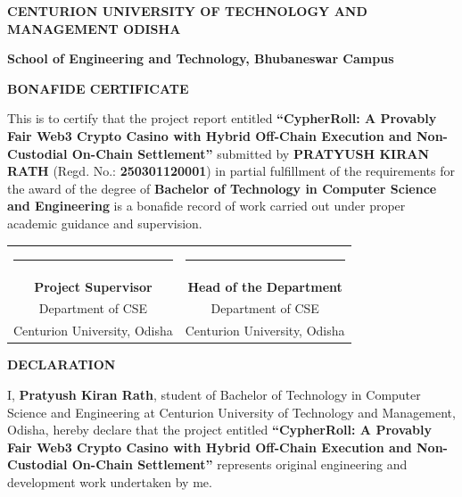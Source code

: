 \newpage
{}
\setcounter{page}{2}
\pagestyle{frontmatterstyle}
\thispagestyle{frontmatterstyle}
\begin{center}
    {\large \textbf{CENTURION UNIVERSITY OF TECHNOLOGY AND MANAGEMENT ODISHA}\par}
    \vspace{0.15cm}
    {\normalsize \textbf{School of Engineering and Technology, Bhubaneswar Campus}\par}
    \vspace{0.8cm}
    {\Large \textbf{BONAFIDE CERTIFICATE}\par}
    \vspace{0.8cm}
\end{center}

This is to certify that the project report entitled \textbf{``CypherRoll: A Provably Fair Web3 Crypto Casino with Hybrid Off-Chain Execution and Non-Custodial On-Chain Settlement''} submitted by \textbf{PRATYUSH KIRAN RATH} (Regd. No.: \textbf{250301120001}) in partial fulfillment of the requirements for the award of the degree of \textbf{Bachelor of Technology in Computer Science and Engineering} is a bonafide record of work carried out under proper academic guidance and supervision.

\vspace{3.5cm}

\noindent
\begin{tabular*}{\textwidth}{@{\extracolsep{\fill}}cc}
    \rule{5.5cm}{0.4pt} & \rule{5.5cm}{0.4pt} \\
    \textbf{Project Supervisor} & \textbf{Head of the Department} \\
    Department of CSE & Department of CSE \\
    Centurion University, Odisha & Centurion University, Odisha
\end{tabular*}

\newpage
\pagestyle{frontmatterstyle}
\thispagestyle{frontmatterstyle}
\begin{center}
    {\Large \textbf{DECLARATION}\par}
    \vspace{0.6cm}
\end{center}

I, \textbf{Pratyush Kiran Rath}, student of Bachelor of Technology in Computer Science and Engineering at Centurion University of Technology and Management, Odisha, hereby declare that the project entitled \textbf{``CypherRoll: A Provably Fair Web3 Crypto Casino with Hybrid Off-Chain Execution and Non-Custodial On-Chain Settlement''} represents original engineering and development work undertaken by me.

